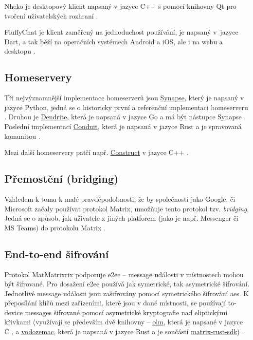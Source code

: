 Nheko je desktopový klient napsaný v jazyce C++ s pomocí knihovny Qt pro tvoření
uživatelských rozhraní \parencite{GitHub-Nheko}.

FluffyChat je klient zaměřený na jednoduchost používání, je napsaný v~jazyce
Dart, a tak běží na operačních systémech Android a iOS, ale i na webu a desktopu
\parencite{FluffyChat-Homepage,GitLab-FluffyChat}.

\subsection{Homeservery}

Tři nejvýznamnější implementace homeserverů jsou
\href{https://github.com/matrix-org/synapse/}{Synapse}, který je napsaný v
jazyce Python, jedná se o historicky první a referenční implementaci homeserveru
\parencite{GitHub-Synapse}. Druhou je
\href{https://github.com/matrix-org/dendrite/}{Dendrite}, která je napsaná v
jazyce Go a má být nástupce Synapse \parencite{GitHub-Dendrite}. Poslední
implementací \href{https://github.com/timokoesters/conduit}{Conduit}, která je
napsaná v jazyce Rust a je spravovaná komunitou \parencite{GitHub-Conduit}.

Mezi další homeservery patří např.
\href{https://github.com/matrix-construct/construct}{Construct} v jazyce C++
\parencite{GitHub-Construct}.

\subsection{Přemostění (bridging)}

Vzhledem k tomu k malé pravděpodobnosti, že by společnosti jako Google, či
Microsoft začaly používat protokol Matrix, umožňuje tento protokol tzv.
\textit{bridging}. Jedná se o způsob, jak  uživatele z jiných
platforem (jako je např. Messenger či MS Teams) do protokolu Matrix
\parencite{MatrixORG-Bridges}.

\subsection{End-to-end šifrování}\label{matrix-encryption}

Protokol MatMatrixrix podporuje \gls{e2ee} -- message události v místnostech
mohou být šifrované. Pro dosažení \gls{e2ee} používá jak symetrické, tak
asymetrické šifrování. Jednotlivé message události jsou zašifrovány pomocí
symetrického šifrování \gls{aes}. K přeposílání klíčů mezi zařízeními, které
jsou v dané místnosti, se používají to-device messages šifrované pomocí
asymetrické kryptografie nad eliptickými křivkami (využívají se především dvě
knihovny -- \href{https://gitlab.matrix.org/matrix-org/olm}{olm}, která je
napsané v jazyce C \parencite{GitLab-Olm}, a
\href{https://github.com/matrix-org/vodozemac}{vodozemac}, která je napsaná v
jazyce Rust a je součástí
\href{https://github.com/matrix-org/matrix-rust-sdk}{matrix-rust-sdk})
\parencite{GitHub-MatrixRustSDK}.

